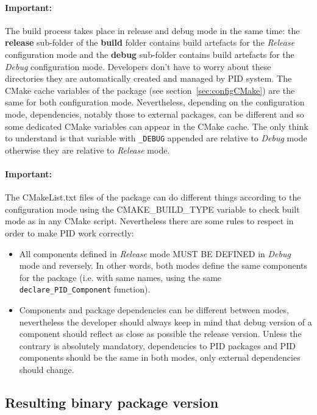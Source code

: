 \documentclass[12pt,a4paper]{article}
\begin{document}
\paragraph{Important:} The build process takes place in release and debug mode in the same time: the \textbf{release} sub-folder of the \textbf{build} folder contains build artefacts for the \textit{Release} configuration mode and the \textbf{debug} sub-folder contains build artefacts for the \textit{Debug} configuration mode. Developers don't have to worry about these directories they are automatically created and managed by PID system. The CMake cache variables of the package (see section~\ref{sec:configCMake}) are the same for both configuration mode. Nevertheless, depending on the configuration mode, dependencies, notably those to external packages, can be different and so some dedicated CMake variables can appear in the CMake cache. The only think to understand is that variable with \texttt{\_DEBUG} appended are relative to \textit{Debug} mode otherwise they are relative to \textit{Release} mode. 

\paragraph{Important:} The CMakeList.txt files of the package can do different things according to the configuration mode using the CMAKE\_BUILD\_TYPE variable to check built mode as in any  CMake script. Nevertheless there are some rules to respect in order to make PID work correctly:
\begin{itemize}
\item All components defined in \textit{Release} mode MUST BE DEFINED in \textit{Debug} mode and reversely. In other words, both modes define the same components for the package (i.e. with same names, using the same \texttt{declare\_PID\_Component} function).
\item Components and package dependencies can be different between modes, nevertheless the developer should always keep in mind that debug version of a component should reflect as close as possible the release version. Unless the contrary is absolutely mandatory, dependencies to PID packages and PID components should be the same in both modes, only external dependencies should change.
\end{itemize}

\subsection{Resulting binary package version}
\label{sec:CMakeInstallBinary}
\end{document}
